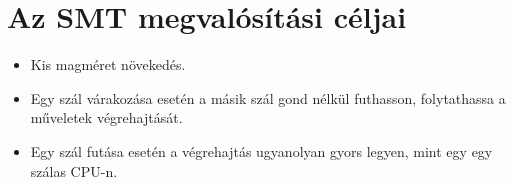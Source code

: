 \section{Az SMT megvalósítási céljai}
\begin{itemize}
    \item Kis magméret növekedés.
    \item Egy szál várakozása esetén a másik szál gond nélkül futhasson, folytathassa a műveletek végrehajtását.
    \item Egy szál futása esetén a végrehajtás ugyanolyan gyors legyen, mint egy egy szálas CPU-n.
\end{itemize}